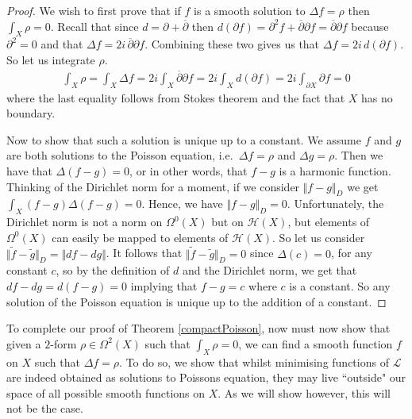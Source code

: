 \documentclass[11pt]{report}
\theoremstyle{definition}
\begin{document}
\begin{proof}
  We wish to first prove that if $f$ is a smooth solution to $\Delta f = \rho$ then $\int_X \rho = 0$. Recall that since $d = \partial + \overline{\partial}$ then $d(\partial f) = \partial^2 f + \overline{\partial}\partial f = \overline{\partial}\partial f$ because $\partial^2 = 0$ and that $\Delta f = 2i \, \overline{\partial}\partial f$. Combining these two gives us that $\Delta f =2i\,d(\partial f)$. So let us integrate $\rho$.
  \begin{align*}
    \int_X \rho = \int_X \Delta f = 2i \int_X \overline{\partial}\partial f = 2i \int_X d(\partial f) = 2i\int_{\partial X}\partial f = 0
  \end{align*}
  where the last equality follows from Stokes theorem and the fact that $X$ has no boundary. 

  Now to show that such a solution is unique up to a constant. We assume $f$ and $g$ are both solutions to the Poisson equation, i.e.\ $\Delta f = \rho$ and $\Delta g = \rho$. Then we have that $\Delta (f - g) = 0$, or in other words, that $f-g$ is a harmonic function. Thinking of the Dirichlet norm for a moment, if we consider $\Vert f-g\Vert _D$ we get $\int_X (f-g)\Delta(f-g) = 0$. Hence, we have $\Vert f-g\Vert _D = 0$. Unfortunately, the Dirichlet norm is not a norm on $\Omega^0(X)$ but on $\mathcal{H}(X)$, but elements of $\Omega^0(X)$ can easily be mapped to elements of $\mathcal{H}(X)$. So let us consider $\Vert \tilde{f}-\tilde{g}\Vert _D = \Vert df - dg\Vert $. It follows that $\Vert \tilde{f}- \tilde{g}\Vert _D = 0$ since $\Delta(c) = 0$, for any constant $c$, so by the definition of $d$ and the Dirichlet norm, we get that $ df - dg = d(f-g) = 0$ implying that $f - g = c$ where $c$ is a constant. So any solution of the Poisson equation is unique up to the addition of a constant.
\end{proof} 

To complete our proof of Theorem \ref{compactPoisson}, now must now show that given a $2$-form $\rho \in \Omega^2(X)$ such that $\int_X \rho = 0$, we can find a smooth function $f$ on $X$ such that $\Delta f = \rho$. To do so, we show that whilst minimising functions of $\mathcal{L}$ are indeed obtained as solutions to Poissons equation, they may live ``outside" our space of all possible smooth functions on $X$. As we will show however, this will not be the case.
\end{document}
